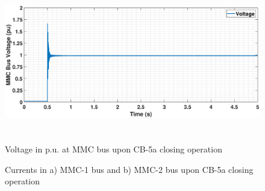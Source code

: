 \begin{figure}[H]
    \includegraphics[height = 7cm,width = \textwidth]{Diagrams/Chapter_5/VACP_MMC_1_2_CB_5a.eps}
    \caption{Voltage in p.u. at MMC bus upon CB-5a closing operation}
    \label{fig:VACP_MMC_1_2_CB_5a}
\end{figure}

\begin{figure}[H]


\caption{Currents in a) MMC-1 bus and b) MMC-2 bus upon CB-5a closing operation}
\label{fig:IABC_MMC_1_2_CB_5a}
\end{figure}

